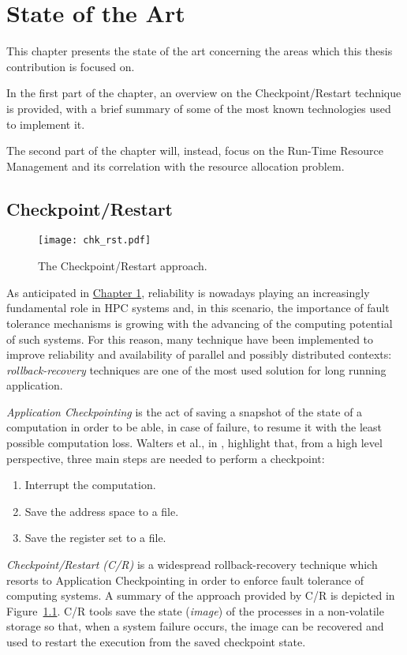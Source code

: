 %
\chapter{State of the Art}
%
\label{cap:stateofart}
This chapter presents the state of the art concerning the areas which this thesis contribution is focused on. 

In the first part of the chapter, an overview on the Checkpoint/Restart technique is provided, with a brief summary of some of the most known technologies used to implement it.

The second part of the chapter will, instead, focus on the Run-Time Resource Management and its correlation with the resource allocation problem.

\section{Checkpoint/Restart}
\label{sec:criu}
\begin{figure}
    \centering
    \texttt{[image: chk\_rst.pdf]}
    \caption{The Checkpoint/Restart approach.}
    \label{fig:chkrst}
\end{figure}
As anticipated in {\hyperref[cap:introduction]{Chapter 1}}, reliability is nowadays playing an increasingly fundamental role in HPC systems and, in this scenario, the importance of fault tolerance mechanisms is growing with the advancing of the computing potential of such systems. For this reason, many technique have been implemented to improve reliability and availability of parallel and  possibly distributed contexts: \emph{rollback-recovery} techniques are one of the most used solution for long running application.

\emph{Application Checkpointing} is the act of saving a snapshot of the state of a computation in order to be able, in case of failure, to resume it with the least possible computation loss. Walters et al., in \cite{app-checkpoint}, highlight that, from a high level perspective, three main steps are needed to perform a checkpoint:
\begin{enumerate}
    \item Interrupt the computation.
    \item Save the address space to a file.
    \item Save the register set to a file.
\end{enumerate}
\emph{Checkpoint/Restart (C/R)} is a widespread rollback-recovery technique which resorts to Application Checkpointing in order to enforce fault tolerance of computing systems. A summary of the approach provided by C/R is depicted in Figure~\ref{fig:chkrst}. C/R tools save the state (\emph{image}) of the processes in a non-volatile storage so that, when a system failure occurs, the image can be recovered and used to restart the execution from the saved checkpoint state.

